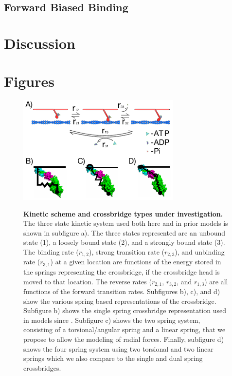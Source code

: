 \documentclass[]{article}
\begin{document}
\subsection*{Forward Biased Binding}



\section*{Discussion} %
\label{sec:discussion}



\section*{Figures} %
\label{sec:figures}

\begin{figure}[p]
    \begin{center}
    \includegraphics[width=3.2in]{../imgs/Figure1.pdf}
    \label{fig:types}
    \caption{
        \textbf{Kinetic scheme and crossbridge types under investigation.} 
        The three state kinetic system used both here and in prior models is shown in subfigure a). The three states represented are an unbound state (1), a loosely bound state (2), and a strongly bound state (3). The binding rate ($r_{1,2}$), strong transition rate ($r_{2,3}$), and unbinding rate ($r_{3,1}$) at a given location are functions of the energy stored in the springs representing the crossbridge, if the crossbridge head is moved to that location. The reverse rates ($r_{2,1}$, $r_{3,2}$, and $r_{1,3}$) are all functions of the forward transition rates.
        Subfigures b), c), and d) show the various spring based representations of the crossbridge. Subfigure b) shows the single spring crossbridge representation used in models since \cite{Huxley1957e}. Subfigure c) shows the two spring system, consisting of a torsional/angular spring and a linear spring, that we propose to allow the modeling of radial forces. Finally, subfigure d) shows the four spring system using two torsional and two linear springs which we also compare to the single and dual spring crossbridges.
    }
    \end{center}
\end{figure}
\end{document}

